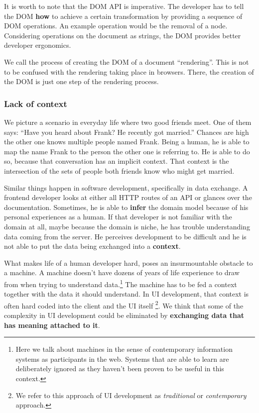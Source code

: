 It is worth to note that the DOM API is imperative. The developer has to tell the DOM \textbf{how} to achieve a certain transformation by providing a sequence of DOM operations. An example operation would be the removal of a node. Considering operations on the document as strings, the DOM provides better developer ergonomics.

We call the process of creating the DOM of a document ``rendering''. This is not to be confused with the rendering taking place in browsers. There, the creation of the DOM is just one step of the rendering process.

\subsubsection{Lack of context}\label{datahumanmachine}
We picture a scenario in everyday life where two good friends meet. One of them says: ``Have you heard about Frank? He recently got married.'' Chances are high the other one knows multiple people named Frank. Being a human, he is able to map the name Frank to the person the other one is referring to. He is able to do so, because that conversation has an implicit context. That context is the intersection of the sets of people both friends know who might get married.

Similar things happen in software development, specifically in data exchange. A \gls{frontend} developer looks at either all HTTP routes of an API or glances over the documentation. Sometimes, he is able to \textbf{infer} the domain model because of his personal experiences as a human. If that developer is not familiar with the domain at all, maybe because the domain is niche, he has trouble understanding data coming from the server. He perceives development to be difficult and he is not able to put the data being exchanged into a \textbf{context}.

What makes life of a human developer hard, poses an insurmountable obstacle to a machine. A machine doesn't have dozens of years of life experience to draw from when trying to understand data.\footnote{Here we talk about machines in the sense of contemporary information systems as participants in the web. Systems that are able to learn are deliberately ignored as they haven't been proven to be useful in this context.} The machine has to be fed a context together with the data it should understand. In UI development, that context is often hard coded into the client and the UI itself \footnote{We refer to this approach of UI development as \textit{traditional} or \textit{contemporary} approach.}. We think that some of the complexity in UI development could be eliminated by \textbf{exchanging data that has meaning attached to it}.

